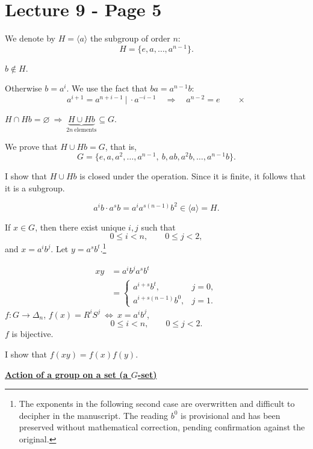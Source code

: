 
\section*{Lecture 9 - Page 5}

\noindent We denote by $H=\langle a\rangle$ the subgroup of order $n$:
\[
H=\{e,a,\ldots,a^{n-1}\}.
\]

\noindent $b\notin H$.

\noindent Otherwise $b=a^i$. We use the fact that $ba=a^{n-1}b$:
\[
a^{i+1}=a^{n+i-1}\ \big|\ \cdot a^{-i-1}
\quad\Longrightarrow\quad a^{n-2}=e\qquad\times
\]

\bigskip
\noindent $H\cap Hb=\varnothing\ \Longrightarrow\ \underbrace{H\cup Hb}_{2n\ \text{elements}}\subseteq G$.

\bigskip
\noindent We prove that $H\cup Hb=G$, that is,
\[
G=\{e,a,a^2,\ldots,a^{n-1},\ b,ab,a^2b,\ldots,a^{n-1}b\}.
\]

\noindent I show that $H\cup Hb$ is closed under the operation. Since it is finite,
it follows that it is a subgroup.

\[
a^i b\cdot a^s b=a^i a^{s(n-1)}b^2\in\langle a\rangle=H.
\]

\bigskip
\noindent If $x\in G$, then there exist unique $i,j$ such that
\[
0\leq i<n,\qquad 0\leq j<2,
\]
\noindent and $x=a^i b^j$. Let $y=a^s b^t$.\footnote{The exponents in the following second case are overwritten and difficult to decipher in the manuscript. The reading $b^0$ is provisional and has been preserved without mathematical correction, pending confirmation against the original.}

\[
\begin{aligned}
xy&=a^i b^j a^s b^t\\
  &=\begin{cases}
      a^{i+s}b^t, & j=0,\\[2pt]
      a^{i+s(n-1)}b^0, & j=1.
    \end{cases}
\end{aligned}
\]
\bigskip
\noindent $f:G\longrightarrow\Delta_n$,\quad
$f(x)=R^iS^j\ \Longleftrightarrow\ x=a^i b^j$,
\[
0\leq i<n,\qquad 0\leq j<2.
\]
\noindent $f$ is bijective.

\noindent I show that $f(xy)=f(x)f(y)$.

\bigskip
\noindent\underline{\textbf{Action of a group on a set (a $G$-set)}}

